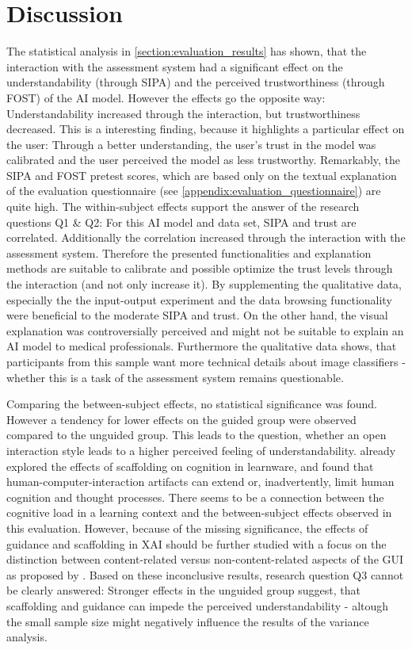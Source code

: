 \documentclass[11pt,a4paper,english]{scrreprt}
\begin{document}
\section{Discussion}
The statistical analysis in \autoref{section:evaluation_results} has shown, that the interaction with the assessment system had a significant effect on the understandability (through SIPA) and the perceived trustworthiness (through FOST) of the AI model. However the effects go the opposite way: Understandability increased through the interaction, but trustworthiness decreased. This is a interesting finding, because it highlights a particular effect on the user: Through a better understanding, the user's trust in the model was calibrated and the user perceived the model as less trustworthy. Remarkably, the SIPA and FOST pretest scores, which are based only on the textual explanation of the evaluation questionnaire (see \autoref{appendix:evaluation_questionnaire}) are quite high. The within-subject effects support the answer of the research questions Q1 \& Q2: For this AI model and data set, SIPA and trust are correlated. Additionally the correlation increased through the interaction with the assessment system. Therefore the presented functionalities and explanation methods are suitable to calibrate and possible optimize the trust levels through the interaction (and not only increase it). By supplementing the qualitative data, especially the the input-output experiment and the data browsing functionality were beneficial to the moderate SIPA and trust. On the other hand, the visual explanation was controversially perceived and might not be suitable to explain an AI model to medical professionals. Furthermore the qualitative data shows, that participants from this sample want more technical details about image classifiers - whether this is a task of the assessment system remains questionable.

Comparing the between-subject effects, no statistical significance was found. However a tendency for lower effects on the guided group were observed compared to the unguided group. This leads to the question, whether an open interaction style leads to a higher perceived feeling of understandability. \textcite{sedig_role_2001} already explored the effects of scaffolding on cognition in learnware, and found that human-computer-interaction artifacts can extend or, inadvertently, limit human cognition and thought processes. There seems to be a connection between the cognitive load in a learning context and the between-subject effects observed in this evaluation. However, because of the missing significance, the effects of guidance and scaffolding in XAI should be further studied with a focus on the distinction between content-related versus non-content-related aspects of the GUI as proposed by \textcite{sedig_role_2001}. Based on these inconclusive results, research question Q3 cannot be clearly answered: Stronger effects in the unguided group suggest, that scaffolding and guidance can impede the perceived understandability - altough the small sample size might negatively influence the results of the variance analysis.
\end{document}
